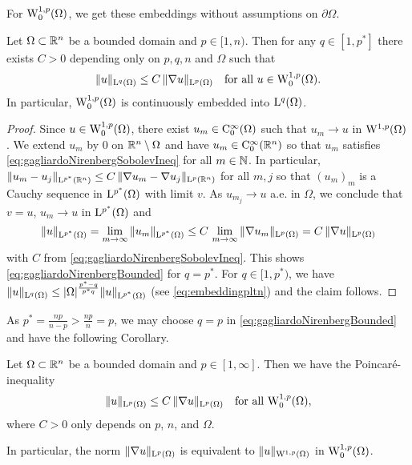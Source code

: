 For $\mathrm{W}_0^{1,p}(\Omega)$, we get these embeddings without assumptions on $\partial\Omega$.

\begin{thm}
  Let $\Omega \subset \mathbb{R}^n$ be a bounded domain and $p \in [1,n)$.
  Then for any $q \in [1,p^*]$ there exists $C > 0$ depending only on $p,q,n$ and $\Omega$ such that 
  \begin{equation}
    \label{eq:gagliardoNirenbergBounded}
    \|u\|_{\mathrm{L}^q(\Omega)} \leq C \, \|\nabla u\|_{\mathrm{L}^p(\Omega)} \quad\text{for all } u \in \mathrm{W}_0^{1,p}(\Omega).
  \end{equation}
  In particular, $\mathrm{W}_0^{1,p}(\Omega)$ is continuously embedded into $\mathrm{L}^q(\Omega)$.
\end{thm}

\begin{proof}
  Since $u \in \mathrm{W}_0^{1,p}(\Omega)$, there exist $u_m \in \mathrm{C}_0^\infty(\Omega)$ such that $u_m \to u$ in $\mathrm{W}^{1,p}(\Omega)$.
  We extend $u_m$ by $0$ on $\mathbb{R}^n\setminus \Omega$ and have $u_m \in \mathrm{C}_0^\infty(\mathbb{R}^n)$ so that $u_m$ satisfies \eqref{eq:gagliardoNirenbergSobolevIneq} for all $m \in \mathbb{N}$.
  In particular, $\|u_m - u_j\|_{\mathrm{L}^{p^*}(\mathbb{R}^n)} \leq C \, \| \nabla u_m - \nabla u_j\|_{\mathrm{L}^p(\mathbb{R}^n)}$ for all $m,j$ so that $(u_m)_m$ is a Cauchy sequence in $\mathrm{L}^{p^*}(\Omega)$ with limit $v$.
  As $u_{m_j} \to u$ a.e. in $\Omega$, we conclude that $v = u$, $u_m \to u$ in $\mathrm{L}^{p^*}(\Omega)$ and 
  $$
  \|u\|_{\mathrm{L}^{p^*}(\Omega)}
  = \lim_{m \to \infty} \| u_m \|_{\mathrm{L}^{p^*}(\Omega)}
  \leq C \, \lim_{m \to \infty} \| \nabla u_m\|_{\mathrm{L}^p(\Omega)}
  = C \, \| \nabla u\|_{\mathrm{L}^p(\Omega)}
  $$
  with $C$ from \eqref{eq:gagliardoNirenbergSobolevIneq}.
  This shows \eqref{eq:gagliardoNirenbergBounded} for $q = p^*$.
  For $q \in [1,p^*)$, we have $\|u\|_{\mathrm{L}^q(\Omega)} \leq |\Omega|^{\frac{p^* - q}{p^* q}} \|u\|_{\mathrm{L}^{p^*}(\Omega)}$ (see \eqref{eq:embeddingpltn}) and the claim follows.
\end{proof}

As $p^* = \frac{np}{n - p} > \frac{np}{n} = p$, we may choose $q = p$ in \eqref{eq:gagliardoNirenbergBounded} and have  the following Corollary.

\begin{cor}
  \label{cor:poincare}
  Let $\Omega \subset \mathbb{R}^n$ be a bounded domain and $p \in [1,\infty]$. 
  Then we have the Poincar\'e-inequality
  \begin{equation}
    \label{eq:poincare}
    \|u\|_{\mathrm{L}^p(\Omega)} \leq C \, \|\nabla u\|_{\mathrm{L}^p(\Omega)} \quad\text{for all } \mathrm{W}_0^{1,p}(\Omega),
  \end{equation}
  where $C > 0$ only depends on $p$, $n$, and $\Omega$.

  In particular, the norm $\|\nabla u\|_{\mathrm{L}^p(\Omega)}$ is equivalent to $\|u\|_{\mathrm{W}^{1,p}(\Omega)}$ in $\mathrm{W}_0^{1,p}(\Omega)$.
\end{cor}

